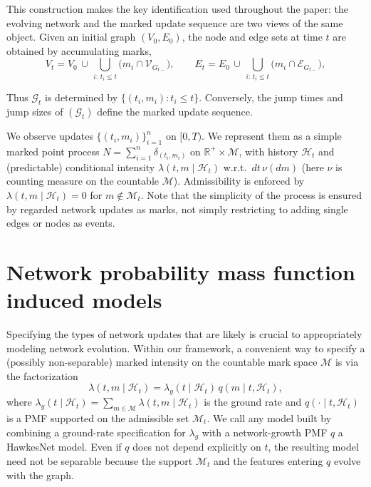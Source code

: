 \documentclass[12pt]{article}
\begin{document}
This construction makes the key identification used throughout the paper: the evolving network and the marked update sequence are two views of the same object. Given an initial graph $(V_0,E_0)$, the node and edge sets at time $t$ are obtained by accumulating marks,
\[
V_t = V_0 \,\cup\, \bigcup_{i:\,t_i\le t}\bigl(m_i\cap\mathcal V_{G_{t-}}\bigr),
\qquad
E_t = E_0 \,\cup\, \bigcup_{i:\,t_i\le t}\bigl(m_i\cap\mathcal E_{G_{t-}}\bigr),
\]

Thus $\mathcal G_t$ is determined by $\{(t_i,m_i):t_i\le t\}$. Conversely, the jump times and jump sizes of $(\mathcal G_t)$ define the marked update sequence.

We observe updates $\{(t_i,m_i)\}_{i=1}^n$ on $[0,T)$. We represent them as a simple marked point process
$N=\sum_{i=1}^n \delta_{(t_i,m_i)}$ on $\mathbb R^+\times\mathcal M$, with history $\mathcal H_t$ and (predictable) conditional intensity
$\lambda(t,m\mid\mathcal H_t)$ w.r.t.\ $dt\,\nu(dm)$ (here $\nu$ is counting measure on the countable $\mathcal M$).
Admissibility is enforced by $\lambda(t,m\mid\mathcal H_t)=0$ for $m\notin\mathcal M_t$. Note that the simplicity of the process is ensured by regarded network updates as marks, not simply restricting to adding single edges or nodes as events.

\section{Network probability mass function induced models}\label{sec:induced_models}

Specifying the types of network updates that are likely is crucial to appropriately modeling network evolution. Within our framework, a convenient way to specify a (possibly non-separable) marked intensity on the countable mark space $\mathcal M$ is via the factorization
\begin{equation}\label{eq:lambda_factor_induced}
\lambda(t,m\mid\mathcal H_t)=\lambda_g(t\mid\mathcal H_t)\,q(m\mid t,\mathcal H_t),
\end{equation}
where $\lambda_g(t\mid\mathcal H_t)=\sum_{m\in\mathcal M}\lambda(t,m\mid\mathcal H_t)$ is the ground rate and $q(\cdot\mid t,\mathcal H_t)$ is a PMF supported on the admissible set $\mathcal M_t$.
We call any model built by combining a ground-rate specification for $\lambda_g$ with a network-growth PMF $q$ a HawkesNet model. Even if $q$ does not depend explicitly on $t$, the resulting model need not be separable because the support $\mathcal M_t$ and the features entering $q$ evolve with the graph.
\end{document}
